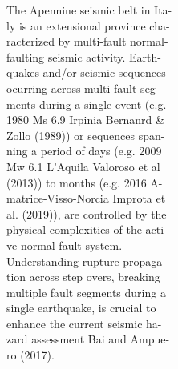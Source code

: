 {\begin{minipage}{0.44\linewidth}
{\begin{spacing}{1.0}
 The Apennine seismic belt in Ita-\\
 ly is an extensional province cha-\\
 racterized by multi-fault normal-\\
 faulting seismic activity. Earth-\\
 quakes and/or seismic sequences \\
 ocurring across multi-fault seg-\\
 ments during a single event (e.g. \\
 1980 Ms 6.9 Irpinia Bernanrd \&\\
 Zollo (1989)) or sequences span-\\
 ning a period of days (e.g. 2009 \\
 Mw 6.1 L’Aquila Valoroso et al \\ 
 (2013)) to months (e.g. 2016 A-\\
 matrice-Visso-Norcia Improta et\\
 al. (2019)), are controlled by the\\
 physical complexities of the acti-\\
 ve normal fault system. \\
 
 Understanding rupture propaga- \\
 tion across step overs, breaking\\
 multiple fault segments during a\\
 single earthquake, is crucial to\\
 enhance the current seismic ha-\\
 zard assessment Bai and Ampue-\\
 ro (2017). \\ \nocite{Bai_2017_ESD} \\
 \end{spacing} 
 }
\end{minipage}
\vskip -0.8cm


}



